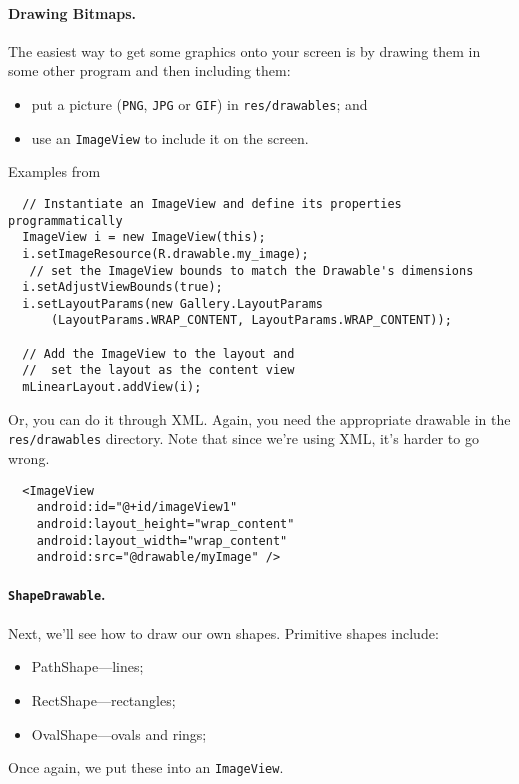 \paragraph{Drawing Bitmaps.} 
The easiest way to get some graphics onto your screen is by
drawing them in some other program and then including them:
\begin{itemize}
\item put a picture ({\tt PNG}, {\tt JPG} or {\tt GIF}) in {\tt res/drawables}; and
\item use an {\tt ImageView} to include it on the screen.
\end{itemize}

Examples from~\cite{android:graphics}
\begin{verbatim}
  // Instantiate an ImageView and define its properties programmatically
  ImageView i = new ImageView(this);
  i.setImageResource(R.drawable.my_image);
   // set the ImageView bounds to match the Drawable's dimensions
  i.setAdjustViewBounds(true);
  i.setLayoutParams(new Gallery.LayoutParams
      (LayoutParams.WRAP_CONTENT, LayoutParams.WRAP_CONTENT));

  // Add the ImageView to the layout and 
  //  set the layout as the content view
  mLinearLayout.addView(i);
\end{verbatim}

Or, you can do it through XML. Again, you need the appropriate
drawable in the {\tt res/drawables} directory. Note that since we're
using XML, it's harder to go wrong.

\begin{verbatim}
  <ImageView
    android:id="@+id/imageView1"
    android:layout_height="wrap_content"
    android:layout_width="wrap_content"
    android:src="@drawable/myImage" />
\end{verbatim}

\paragraph{{\tt ShapeDrawable}.} Next, we'll see how to draw our own shapes.
Primitive shapes include:
\begin{itemize}
\item PathShape---lines;
\item RectShape---rectangles;
\item OvalShape---ovals and rings;
\end{itemize}
Once again, we put these into an {\tt ImageView}.

